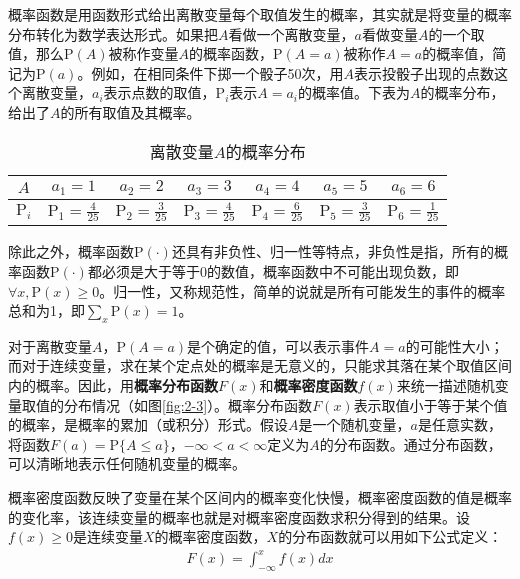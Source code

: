 \parinterval 概率函数是用函数形式给出离散变量每个取值发生的概率，其实就是将变量的概率分布转化为数学表达形式。如果把$A$看做一个离散变量，$a$看做变量$A$的一个取值，那么$\textrm{P}(A)$被称作变量$A$的概率函数，$\textrm{P}(A=a)$被称作$A = a$的概率值，简记为$\textrm{P}(a)$。例如，在相同条件下掷一个骰子50次，用$A$表示投骰子出现的点数这个离散变量，$a_i$表示点数的取值，$\textrm{P}_i$表示$A=a_i$的概率值。下表为$A$的概率分布，给出了$A$的所有取值及其概率。

\begin{table}[htp]
\centering
\caption{离散变量$A$的概率分布}
\begin{tabular}{c|c c c c c c}
\rule{0pt}{15pt}     $A$ & $a_1=1$ & $a_2=2$ & $a_3=3$ & $a_4=4$ & $a_5=5$ & $a_6=6$\\
               \hline
\rule{0pt}{15pt}     $\textrm{P}_i$ & $\textrm{P}_1=\frac{4}{25}$  &  $\textrm{P}_2=\frac{3}{25}$ &  $\textrm{P}_3=\frac{4}{25}$ & $\textrm{P}_4=\frac{6}{25}$ & $\textrm{P}_5=\frac{3}{25}$ & $\textrm{P}_6=\frac{1}{25}$  \\
             \end{tabular}
             \label{tab:2-1}
\end{table}

\parinterval 除此之外，概率函数$\textrm{P}(\cdot)$还具有非负性、归一性等特点，非负性是指，所有的概率函数$\textrm{P}(\cdot)$都必须是大于等于0的数值，概率函数中不可能出现负数，即$\forall{x},\textrm{P}{(x)}\geq{0}$。归一性，又称规范性，简单的说就是所有可能发生的事件的概率总和为1，即$\sum_{x}\textrm{P}{(x)}={1}$。

\parinterval 对于离散变量$A$，$\textrm{P}(A=a)$是个确定的值，可以表示事件$A=a$的可能性大小；而对于连续变量，求在某个定点处的概率是无意义的，只能求其落在某个取值区间内的概率。因此，用{\small\sffamily\bfseries{概率分布函数}}$F(x)$和{\small\sffamily\bfseries{概率密度函数}}$f(x)$来统一描述随机变量取值的分布情况（如图\ref{fig:2-3}）。概率分布函数$F(x)$表示取值小于等于某个值的概率，是概率的累加（或积分）形式。假设$A$是一个随机变量，$a$是任意实数，将函数$F(a)=\textrm{P}\{A\leq a\}$，$-\infty<a<\infty $定义为$A$的分布函数。通过分布函数，可以清晰地表示任何随机变量的概率。

\parinterval 概率密度函数反映了变量在某个区间内的概率变化快慢，概率密度函数的值是概率的变化率，该连续变量的概率也就是对概率密度函数求积分得到的结果。设$f(x) \geq 0$是连续变量$X$的概率密度函数，$X$的分布函数就可以用如下公式定义：
\begin{eqnarray}
F(x)=\int_{-\infty}^x f(x)dx
\label{eq:2-1}
\end{eqnarray}

